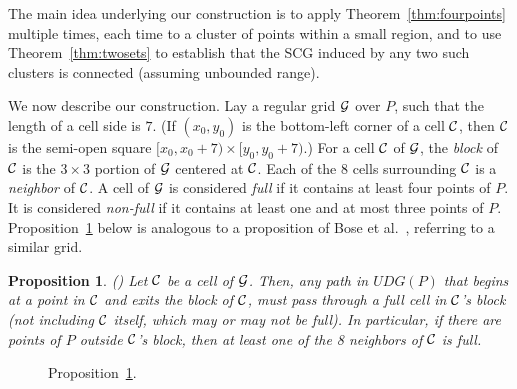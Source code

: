 \documentclass[11pt,letter]{article}
\newtheorem{proposition}[theorem]{Proposition}
\newcommand{\old}[1]{{{}}}
\def\C{{\cal{C}}}
\def\grid{{\cal{G}}}
\def\UDG{{U\!DG}}
\begin{document}
The main idea underlying our construction is to apply Theorem~\ref{thm:fourpoints} multiple times, each time to a cluster of points within a small region, and to use Theorem~\ref{thm:twosets} to establish that the SCG induced by any two such clusters is connected (assuming unbounded range).

We now describe our construction.
Lay a regular grid $\grid$ over $P$, such that the length of a cell side is $7$.
(If $(x_0,y_0)$ is the bottom-left corner of a cell $\C$, then $\C$ is the semi-open square $[x_0, x_0+7) \times [y_0, y_0+7)$.)
For a cell $\C$ of $\grid$, the {\em block} of $\C$ is the $3 \times 3$ portion
of $\grid$ centered at $\C$.
Each of the $8$ cells surrounding $\C$ is a {\em neighbor} of $\C$.
A cell of $\grid$ is considered {\em full} if it contains at least four points of $P$.
It is considered {\em non-full} if it contains at least one and at most three points of $P$.
Proposition~\ref{prop:fullcell} below is analogous to a proposition of Bose et al.~\cite{BCDFKM11}, referring to a similar grid.

\begin{proposition}{(\!\!\cite{BCDFKM11})} \label{prop:fullcell}
Let $\C$ be a cell of $\grid$. Then, any path in $\UDG(P)$ that begins at a point in $\C$
and exits the block of $\C$, must pass through a full cell in $\C$'s block (not including $\C$ itself, which may or may not be full).
In particular, if there are points of $P$ outside $\C$'s block, then at least one of the 8 neighbors of $\C$ is full.
\end{proposition}

\begin{figure}[htp]
   \centering

   \caption{Proposition~\ref{prop:fullcell}.}
   \label{fig:fullcell}
\end{figure}


\old{
\begin{figure}[htp]
   \centering
       \texttt{[image: fig/cell\_size]}
   \caption{Proposition~\ref{prop:fullcell}.}
   \label{fig:fullcell}
\end{figure}
}
\end{document}
